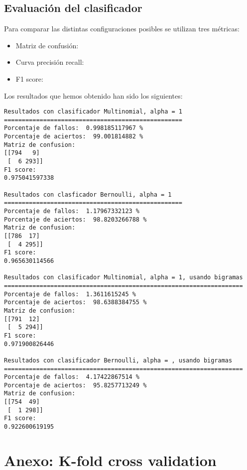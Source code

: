 \documentclass[12pt]{article}
\begin{document}
\subsection{Evaluaci\'on del clasificador}
Para comparar las distintas configuraciones posibles se utilizan tres
m\'etricas:
\begin{itemize}
	\item Matriz de confusi\'on:
	\item Curva precisi\'on recall:
	\item F1 score:
\end{itemize}
Los resultados que hemos obtenido han sido los siguientes:
\begin{verbatim}
Resultados con clasificador Multinomial, alpha = 1
==================================================
Porcentaje de fallos:  0.998185117967 %
Porcentaje de aciertos:  99.001814882 %
Matriz de confusion:
[[794   9]
 [  6 293]]
F1 score:
0.975041597338

Resultados con clasficador Bernoulli, alpha = 1
==================================================
Porcentaje de fallos:  1.17967332123 %
Porcentaje de aciertos:  98.8203266788 %
Matriz de confusion:
[[786  17]
 [  4 295]]
F1 score:
0.965630114566

Resultados con clasificador Multinomial, alpha = 1, usando bigramas
===================================================================
Porcentaje de fallos:  1.3611615245 %
Porcentaje de aciertos:  98.6388384755 %
Matriz de confusion:
[[791  12]
 [  5 294]]
F1 score:
0.971900826446

Resultados con clasificador Bernoulli, alpha = , usando bigramas
===================================================================
Porcentaje de fallos:  4.17422867514 %
Porcentaje de aciertos:  95.8257713249 %
Matriz de confusion:
[[754  49]
 [  1 298]]
F1 score:
0.922600619195
\end{verbatim}

\section{Anexo: K-fold cross validation}
\end{document}
